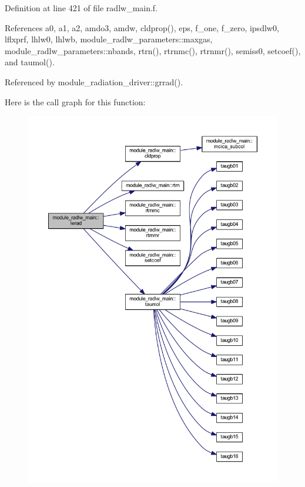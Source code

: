 Definition at line 421 of file radlw\+\_\+main.\+f.



References a0, a1, a2, amdo3, amdw, cldprop(), eps, f\+\_\+one, f\+\_\+zero, ipsdlw0, lflxprf, lhlw0, lhlwb, module\+\_\+radlw\+\_\+parameters\+::maxgas, module\+\_\+radlw\+\_\+parameters\+::nbands, rtrn(), rtrnmc(), rtrnmr(), semiss0, setcoef(), and taumol().



Referenced by module\+\_\+radiation\+\_\+driver\+::grrad().



Here is the call graph for this function\+:
\nopagebreak
\begin{figure}[H]
\begin{center}
\leavevmode
\includegraphics[width=350pt]{group__module__radlw__main_gacff9ff756859e9abcd3905c7725fdff3_cgraph}
\end{center}
\end{figure}




